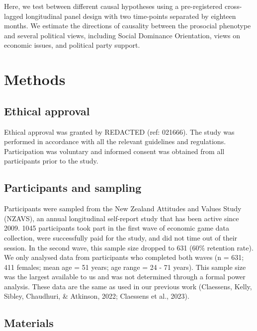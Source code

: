 \documentclass[
  man,floatsintext]{apa6}
\begin{document}
Here, we test between different causal hypotheses using a pre-registered
cross-lagged longitudinal panel design with two time-points separated by
eighteen months. We estimate the directions of causality between the prosocial
phenotype and several political views, including Social Dominance Orientation,
views on economic issues, and political party support.

\hypertarget{methods}{%
\section{Methods}\label{methods}}

\hypertarget{ethical-approval}{%
\subsection{Ethical approval}\label{ethical-approval}}

Ethical approval was granted by REDACTED (ref: 021666). The study was performed
in accordance with all the relevant guidelines and regulations. Participation
was voluntary and informed consent was obtained from all participants prior to
the study.

\hypertarget{participants-and-sampling}{%
\subsection{Participants and sampling}\label{participants-and-sampling}}

Participants were sampled from the New Zealand Attitudes and Values Study
(NZAVS), an annual longitudinal self-report study that has been active since
2009. 1045 participants took part in the first wave of economic game data
collection, were successfully paid for the study, and did not time out
of their session. In the second wave, this sample size dropped to 631
(60\% retention rate). We only analysed data from participants who completed
both waves (n = 631;
411 females; mean age =
51 years; age range =
24 -
71 years). This sample size was
the largest available to us and was not determined through a formal power
analysis. These data are the same as used in our previous work
(Claessens, Kelly, Sibley, Chaudhuri, \& Atkinson, 2022; Claessens et al., 2023).

\hypertarget{materials}{%
\subsection{Materials}\label{materials}}
\end{document}

